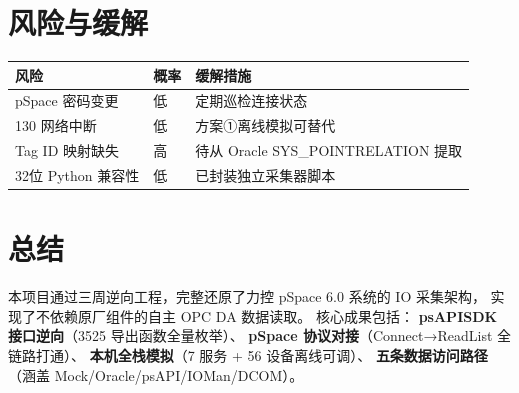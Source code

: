 \documentclass[12pt,a4paper]{ctexart}
\begin{document}
\section{风险与缓解}
\begin{table}[H]\centering
\begin{tabular}{lp{3cm}p{5cm}}
\toprule
\textbf{风险} & \textbf{概率} & \textbf{缓解措施} \\
\midrule
pSpace 密码变更 & 低 & 定期巡检连接状态 \\
130 网络中断 & 低 & 方案①离线模拟可替代 \\
Tag ID 映射缺失 & 高 & 待从 Oracle SYS\_POINTRELATION 提取 \\
32位 Python 兼容性 & 低 & 已封装独立采集器脚本 \\
\bottomrule
\end{tabular}
\end{table}

\section{总结}
本项目通过三周逆向工程，完整还原了力控 pSpace 6.0 系统的 IO 采集架构，
实现了不依赖原厂组件的自主 OPC DA 数据读取。
核心成果包括：
\textbf{psAPISDK 接口逆向}（3525 导出函数全量枚举）、
\textbf{pSpace 协议对接}（Connect→ReadList 全链路打通）、
\textbf{本机全栈模拟}（7 服务 + 56 设备离线可调）、
\textbf{五条数据访问路径}（涵盖 Mock/Oracle/psAPI/IOMan/DCOM）。
\end{document}
